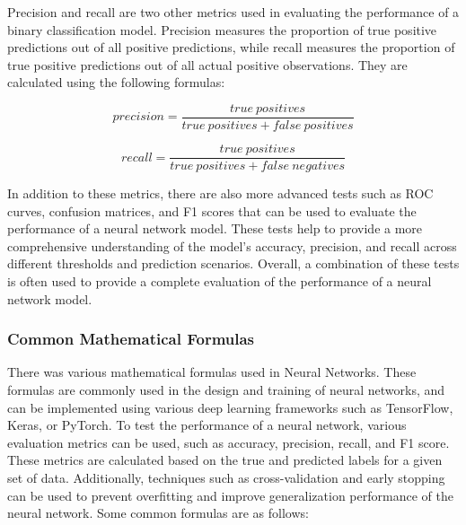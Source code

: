 \documentclass{article}[12pt]
\theoremstyle{definition}
\begin{document}
\bigskip

\noindent
Precision and recall are two other metrics used in evaluating the performance of a binary classification model. Precision measures the proportion of true positive predictions out of all positive predictions, while recall measures the proportion of true positive predictions out of all actual positive observations. They are calculated using the following formulas:

\begin{equation*}
precision = \frac{true\ positives}{true\ positives + false\ positives}
\end{equation*}

\begin{equation*}
recall = \frac{true\ positives}{true\ positives + false\ negatives}
\end{equation*}

\newpage

\noindent
In addition to these metrics, there are also more advanced tests such as ROC curves, confusion matrices, and F1 scores that can be used to evaluate the performance of a neural network model. These tests help to provide a more comprehensive understanding of the model's accuracy, precision, and recall across different thresholds and prediction scenarios. Overall, a combination of these tests is often used to provide a complete evaluation of the performance of a neural network model.

\bigskip

\subsubsection{Common Mathematical Formulas}

\bigskip

There was various mathematical formulas used in Neural Networks. These formulas are commonly used in the design and training of neural networks, and can be implemented using various deep learning frameworks such as TensorFlow, Keras, or PyTorch. To test the performance of a neural network, various evaluation metrics can be used, such as accuracy, precision, recall, and F1 score. These metrics are calculated based on the true and predicted labels for a given set of data. Additionally, techniques such as cross-validation and early stopping can be used to prevent overfitting and improve generalization performance of the neural network. Some common formulas are as follows:

\bigskip
\end{document}
